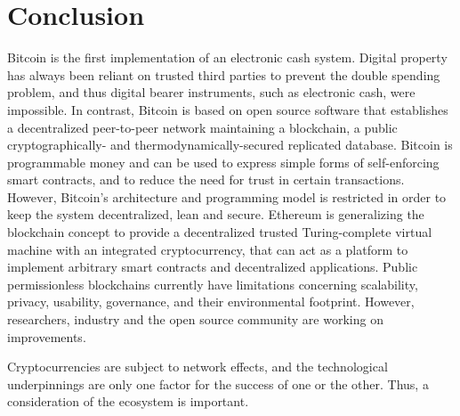 \section{Conclusion}

Bitcoin is the first implementation of an electronic cash system. Digital property has always been reliant on trusted third parties to prevent the double spending problem, and thus digital bearer instruments, such as electronic cash, were impossible. In contrast, Bitcoin is based on open source software that establishes a decentralized peer-to-peer network maintaining a blockchain, a public cryptographically- and thermodynamically-secured replicated database. Bitcoin is programmable money and can be used to express simple forms of self-enforcing smart contracts, and to reduce the need for trust in certain transactions. However, Bitcoin's architecture and programming model is restricted in order to keep the system decentralized, lean and secure. Ethereum is generalizing the blockchain concept to provide a decentralized trusted Turing-complete virtual machine with an integrated cryptocurrency, that can act as a platform to implement arbitrary smart contracts and decentralized applications. Public permissionless blockchains currently have limitations concerning scalability, privacy, usability, governance, and their environmental footprint. However, researchers, industry and the open source community are working on improvements. 

Cryptocurrencies are subject to network effects, and the technological underpinnings are only one factor for the success of one or the other. Thus, a consideration of the ecosystem is important.
